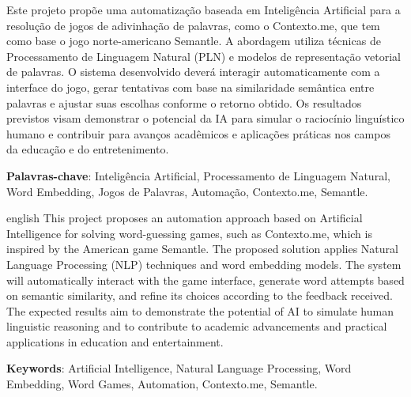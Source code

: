 
\setlength{\absparsep}{18pt} %
\begin{resumo}
Este projeto propõe uma automatização baseada em Inteligência Artificial para a resolução de jogos de adivinhação de palavras, como o Contexto.me, que tem como base o jogo norte-americano Semantle. A abordagem utiliza técnicas de Processamento de Linguagem Natural (PLN) e modelos de representação vetorial de palavras. O sistema desenvolvido deverá interagir automaticamente com a interface do jogo, gerar tentativas com base na similaridade semântica entre palavras e ajustar suas escolhas conforme o retorno obtido. Os resultados previstos visam demonstrar o potencial da IA para simular o raciocínio linguístico humano e contribuir para avanços acadêmicos e aplicações práticas nos campos da educação e do entretenimento.


\textbf{Palavras-chave}: Inteligência Artificial, Processamento de Linguagem Natural, Word Embedding, Jogos de Palavras, Automação, Contexto.me, Semantle.
\end{resumo}

\begin{resumo}[Abstract]
\begin{otherlanguage*}{english}
This project proposes an automation approach based on Artificial Intelligence for solving word-guessing games, such as Contexto.me, which is inspired by the American game Semantle. The proposed solution applies Natural Language Processing (NLP) techniques and word embedding models. The system will automatically interact with the game interface, generate word attempts based on semantic similarity, and refine its choices according to the feedback received. The expected results aim to demonstrate the potential of AI to simulate human linguistic reasoning and to contribute to academic advancements and practical applications in education and entertainment.
   
\textbf{Keywords}: Artificial Intelligence, Natural Language Processing, Word Embedding, Word Games, Automation, Contexto.me, Semantle.
\end{otherlanguage*}
\end{resumo}

% 
%
%  
